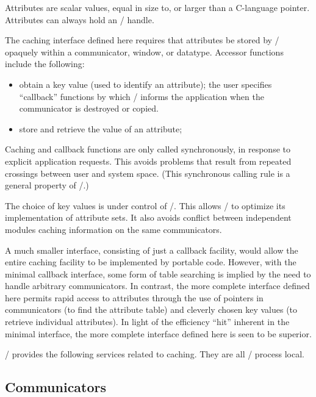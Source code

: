 \begin{implementors}
Attributes are scalar values, equal in size to, or larger than a C-language
pointer. Attributes can always hold an \MPI/ handle.
\end{implementors}

The caching interface defined here
requires
that attributes be
stored by \MPI/ opaquely within a communicator,
window, or datatype.
Accessor functions include the following:
\begin{itemize}
\item
 obtain a key value (used to identify an attribute); the user
 specifies ``callback'' functions by which \MPI/ informs the application
 when the communicator is destroyed or
 copied.
\item
 store and retrieve the value of an attribute;
\end{itemize}

\begin{implementors}
Caching and callback functions are only called synchronously,
in response to explicit application requests. This avoids problems
that result from repeated crossings between user and system space.
(This synchronous calling rule is a general property of \MPI/.)

The choice of key values is under control of \MPI/. This allows \MPI/ to optimize
its implementation of attribute sets. It also avoids conflict between
independent modules caching information on the same communicators.

A much smaller interface, consisting of just a callback facility, would allow
the entire caching facility to be implemented by portable code. However, with
the minimal callback interface, some form of table searching is implied by the
need to handle arbitrary communicators. In contrast, the more complete
interface defined here permits rapid access to attributes through the use of
pointers in communicators (to find the attribute table) and cleverly chosen
key values (to retrieve individual attributes). In light of the efficiency
``hit'' inherent in the minimal interface, the more complete interface defined
here is seen to be superior.
\end{implementors}

\noindent \MPI/ provides the following services related to caching. They are
all \MPI/ process local.

\subsection{Communicators}
\label{subsec:context-cachecomm}

